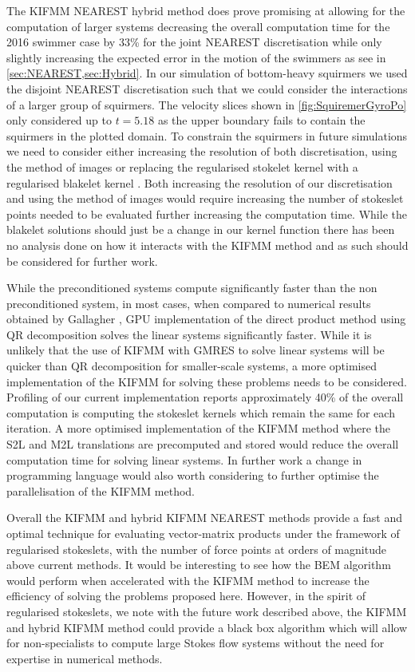The KIFMM NEAREST hybrid method does prove promising at allowing for the computation of larger systems decreasing the overall computation time for the 2016 swimmer case by 33\% for the joint NEAREST discretisation while only slightly increasing the expected error in the motion of the swimmers as see in \cref{sec:NEAREST,sec:Hybrid}. In our simulation of bottom-heavy squirmers we used the disjoint NEAREST discretisation such that we could consider the interactions of a larger group of squirmers. The velocity slices shown in \cref{fig:SquiremerGyroPo} only considered up to $t=5.18$ as the upper boundary fails to contain the squirmers in the plotted domain. To constrain the squirmers in future simulations we need to consider either increasing the resolution of both discretisation, using the method of images \cite{Ainley2008TheStokeslets} or replacing the regularised stokelet kernel with a regularised blakelet kernel \cite{blake_1971,Cortez2015}. Both increasing the resolution of our discretisation and using the method of images would require increasing the number of stokeslet points needed to be evaluated further increasing the computation time. While the blakelet solutions should just be a change in our kernel function there has been no analysis done on how it interacts with the KIFMM method and as such should be considered for further work.    

While the preconditioned systems compute significantly faster than the non preconditioned system, in most cases, when compared to numerical results obtained by Gallagher \cite{Gallagher2020}, GPU implementation of the direct product method using QR decomposition solves the linear systems significantly faster. While it is unlikely that the use of KIFMM with GMRES to solve linear systems will be quicker than QR decomposition for smaller-scale systems, a more optimised implementation of the KIFMM for solving these problems needs to be considered. Profiling of our current implementation reports approximately 40\% of the overall computation is computing the stokeslet kernels which remain the same for each iteration. A more optimised implementation of the KIFMM method where the S2L and M2L translations are precomputed and stored would reduce the overall computation time for solving linear systems. In further work a change in programming language would also worth considering to further optimise the parallelisation of the KIFMM method. 

Overall the KIFMM and hybrid KIFMM NEAREST methods provide a fast and optimal technique for evaluating vector-matrix products under the framework of regularised stokeslets, with the number of force points at orders of magnitude above current methods. It would be interesting to see how the BEM algorithm would perform when accelerated with the KIFMM method \cite{Cao2012ABEM,Cao2015AAnalysis,Betcke2021Bempp-cl:Library.} to increase the efficiency of solving the problems proposed here. However, in the spirit of regularised stokeslets, we note with the future work described above, the KIFMM and hybrid KIFMM method could provide a black box algorithm which will allow for non-specialists to compute large Stokes flow systems without the need for expertise in numerical methods.